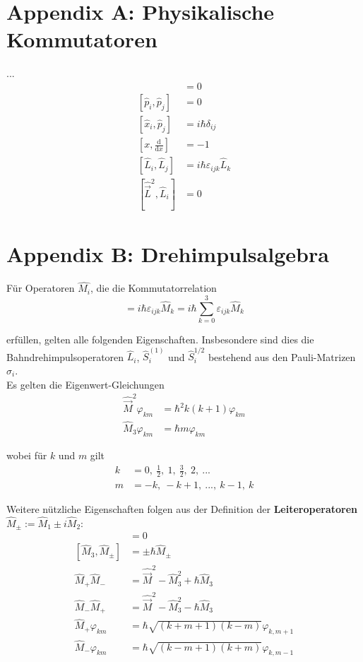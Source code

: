 \documentclass{article}
\newcommand{\diff}{\mathrm{d}}
\begin{document}
\newpage


\section{Appendix A: Physikalische Kommutatoren}
...
	\begin{align}
		[\hat{x}_i, \hat{x}_j] &= 0 \\
		[\hat{p}_i, \hat{p}_j] &= 0 \\
		[\hat{x}_i, \hat{p}_j] &= i\hbar \delta_{ij} \\
		[x, \frac{\diff}{\diff x}] &= -1\\
		[\hat{L}_i, \hat{L}_j] &= i\hbar \varepsilon_{ijk} \hat{L}_k \\
		[\hat{\vec{L}}^2, \hat{L}_i] &= 0
	\end{align}


\newpage


\section{Appendix B: Drehimpulsalgebra}
Für Operatoren $\hat{M_i}$, die die Kommutatorrelation 
	\begin{equation}
		[\hat{M}_i, \hat{M}_j] = i\hbar \varepsilon_{ijk} \hat{M}_k = i\hbar \sum_{k=0}^3 \varepsilon_{ijk} \hat{M}_k
	\end{equation}

erfüllen, gelten alle folgenden Eigenschaften. Insbesondere sind dies die Bahndrehimpulsoperatoren $\hat{L}_i$, $\hat{S}_i^{(1)}$ und $\hat{S}_i^{1/2}$ bestehend aus den Pauli-Matrizen $\sigma_i$.\\
Es gelten die Eigenwert-Gleichungen
	\begin{align}
		\hat{\vec{M}}^2 \varphi_{km} &= \hbar^2 k(k + 1) \varphi_{km}\\
		\hat{M}_3 \varphi_{km} &= \hbar m \varphi_{km}
	\end{align}

wobei für $k$ und $m$ gilt
	\begin{align}
		k &= 0,\ \frac{1}{2},\ 1,\ \frac{3}{2},\ 2,\ ...\\
		m &= -k,\ -k+1,\ ...,\ k-1,\ k
	\end{align}

Weitere nützliche Eigenschaften folgen aus der Definition der \textbf{Leiteroperatoren} $\hat{M}_\pm := \hat{M}_1 \pm i\hat{M}_2$:
	\begin{align*}
		[\hat{\vec{M}}^2, \hat{M}_3] &= 0\\
		[\hat{M}_3, \hat{M}_\pm] &= \pm\hbar\hat{M}_\pm\\
		\hat{M}_+\hat{M}_- &= \hat{\vec{M}}^2 - \hat{M}_3^2 + \hbar\hat{M}_3\\
		\hat{M}_-\hat{M}_+ &= \hat{\vec{M}}^2 - \hat{M}_3^2 - \hbar\hat{M}_3\\
		\hat{M}_+ \varphi_{km} &= \hbar\sqrt{(k+m+1)(k-m)} \varphi_{k,m+1}\\
		\hat{M}_- \varphi_{km} &= \hbar\sqrt{(k-m+1)(k+m)} \varphi_{k,m-1}\\
	\end{align*}
\end{document}
